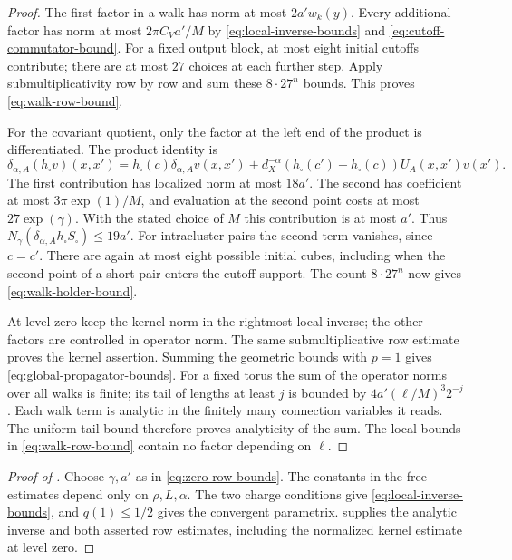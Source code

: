 \begin{proof}
The first factor in a walk has norm at most $2a'w_k(y)$.
Every additional factor has norm at most $2\pi C_Va'/M$ by
\eqref{eq:local-inverse-bounds} and \eqref{eq:cutoff-commutator-bound}.
For a fixed output block, at most eight initial cutoffs contribute;
there are at most $27$ choices at each further step. Apply
submultiplicativity row by row and sum these $8\cdot27^n$ bounds.
This proves \eqref{eq:walk-row-bound}.

For the covariant quotient, only the factor at the left end of the
product is differentiated. The product identity is
\[
 \delta_{\alpha,A}(h_\square v)(x,x')
 =h_\square(c)\delta_{\alpha,A}v(x,x')
   +d_X^{-\alpha}(h_\square(c')-h_\square(c))U_A(x,x')v(x').
\]
The first contribution has localized norm at most $18a'$.
The second has coefficient at most $3\pi\exp(1)/M$, and evaluation
at the second point costs at most $27\exp(\gamma)$. With the stated
choice of $M$ this contribution is at most $a'$. Thus
$N_\gamma(\delta_{\alpha,A}h_\square S_\square)\le19a'$.
For intracluster pairs the second term vanishes, since $c=c'$.
There are again at most eight possible initial cubes, including when
the second point of a short pair enters the cutoff support. The count
$8\cdot27^n$ now gives \eqref{eq:walk-holder-bound}.

At level zero keep the kernel norm in the rightmost local inverse;
the other factors are controlled in operator norm. The same
submultiplicative row estimate proves the kernel assertion.
Summing the geometric bounds with $p=1$ gives
\eqref{eq:global-propagator-bounds}. For a fixed torus the sum of the
operator norms over all walks is finite; its tail of lengths at least
$j$ is bounded by $4a'(\ell/M)^3 2^{-j}$. Each walk term is analytic
in the finitely many connection variables it reads. The uniform tail
bound therefore proves analyticity of the sum. The local bounds in
\eqref{eq:walk-row-bound} contain no factor depending on $\ell$.
\end{proof}


\begin{proof}[Proof of ]
Choose $\gamma,a'$ as in \eqref{eq:zero-row-bounds}.
The constants in the free estimates depend only on $\rho,L,\alpha$.
The two charge conditions give \eqref{eq:local-inverse-bounds},
and $q(1)\le1/2$ gives the convergent parametrix.
 supplies the analytic inverse and
both asserted row estimates, including the normalized kernel estimate
at level zero.
\end{proof}
